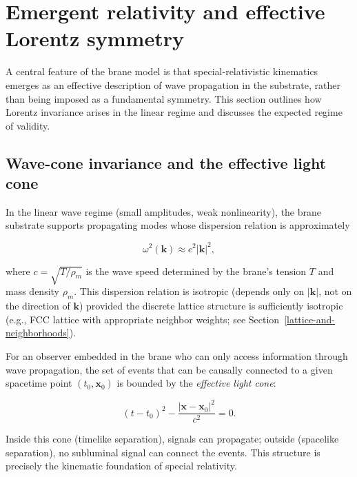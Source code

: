 \section{Emergent relativity and effective Lorentz symmetry}
\label{sec:emergent-relativity}
\label{emergent-relativity-and-lorentz-invariance}

A central feature of the brane model is that special-relativistic kinematics
emerges as an effective description of wave propagation in the substrate, rather
than being imposed as a fundamental symmetry. This section outlines how Lorentz
invariance arises in the linear regime and discusses the expected regime of
validity.

\subsection{Wave-cone invariance and the effective light cone}

In the linear wave regime (small amplitudes, weak nonlinearity), the brane
substrate supports propagating modes whose dispersion relation is approximately

\begin{equation}
\omega^2(\mathbf{k}) \approx c^2 |\mathbf{k}|^2,
\label{eq:linear-dispersion}
\end{equation}

where $c = \sqrt{T/\rho_m}$ is the wave speed determined by the brane's tension
$T$ and mass density $\rho_m$. This dispersion relation is isotropic (depends
only on $|\mathbf{k}|$, not on the direction of $\mathbf{k}$) provided the
discrete lattice structure is sufficiently isotropic (e.g., FCC lattice with
appropriate neighbor weights; see Section~\ref{lattice-and-neighborhoods}).

For an observer embedded in the brane who can only access information through
wave propagation, the set of events that can be causally connected to a given
spacetime point $(t_0, \mathbf{x}_0)$ is bounded by the \emph{effective light
cone}:

\begin{equation}
(t - t_0)^2 - \frac{|\mathbf{x} - \mathbf{x}_0|^2}{c^2} = 0.
\label{eq:light-cone}
\end{equation}

Inside this cone (timelike separation), signals can propagate; outside
(spacelike separation), no subluminal signal can connect the events. This
structure is precisely the kinematic foundation of special relativity.

